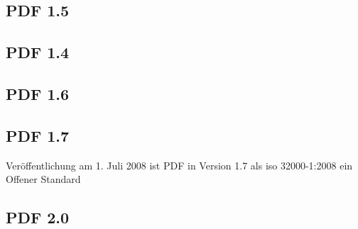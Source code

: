 \subsection{PDF 1.5}

\subsection{PDF 1.4}

\subsection{PDF 1.6}

\subsection{PDF 1.7}
Veröffentlichung am 1. Juli 2008 ist PDF in Version 1.7 als \gls{iso} 32000-1:2008 ein Offener Standard

\subsection{PDF 2.0}